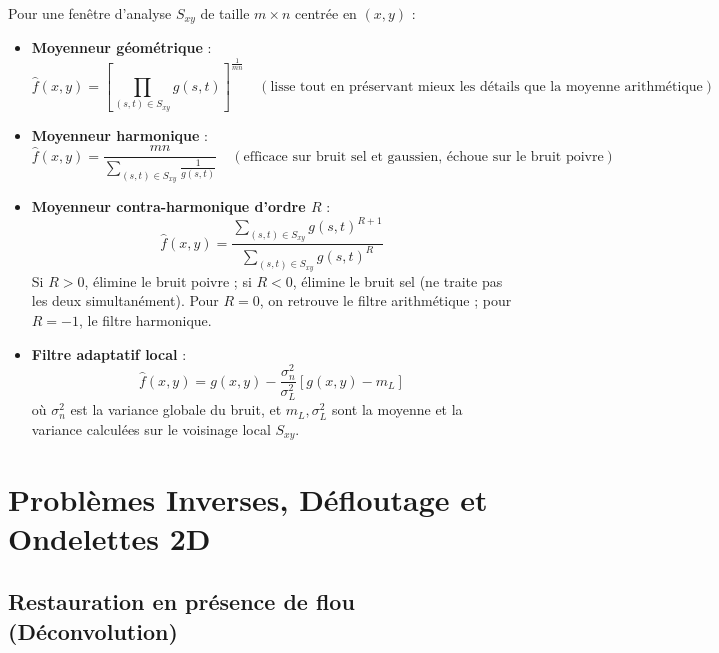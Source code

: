 Pour une fenêtre d'analyse $S_{xy}$ de taille $m \times n$ centrée en $(x,y)$ :
\begin{itemize}
    \item \textbf{Moyenneur géométrique} :
        \begin{equation}
            \hat{f}(x,y) = \left[ \prod_{(s,t) \in S_{xy}} g(s,t) \right]^{\frac{1}{mn}} \quad (\text{lisse tout en préservant mieux les détails que la moyenne arithmétique})
        \end{equation}
    \item \textbf{Moyenneur harmonique} :
        \begin{equation}
            \hat{f}(x,y) = \frac{mn}{\displaystyle \sum_{(s,t) \in S_{xy}} \frac{1}{g(s,t)}} \quad (\text{efficace sur bruit sel et gaussien, échoue sur le bruit poivre})
        \end{equation}
    \item \textbf{Moyenneur contra-harmonique d'ordre $R$} :
        \begin{equation}
            \boxed{\hat{f}(x,y) = \frac{\displaystyle \sum_{(s,t) \in S_{xy}} g(s,t)^{R+1}}{\displaystyle \sum_{(s,t) \in S_{xy}} g(s,t)^R}}
        \end{equation}
        Si $R > 0$, élimine le bruit poivre ; si $R < 0$, élimine le bruit sel (ne traite pas les deux simultanément). Pour $R = 0$, on retrouve le filtre arithmétique ; pour $R = -1$, le filtre harmonique.
    \item \textbf{Filtre adaptatif local} :
        \begin{equation}
            \hat{f}(x,y) = g(x,y) - \frac{\sigma_n^2}{\sigma_L^2} \left[ g(x,y) - m_L \right]
        \end{equation}
        où $\sigma_n^2$ est la variance globale du bruit, et $m_L, \sigma_L^2$ sont la moyenne et la variance calculées sur le voisinage local $S_{xy}$.
\end{itemize}


\section{Problèmes Inverses, Défloutage et Ondelettes 2D}

\subsection{Restauration en présence de flou (Déconvolution)}

